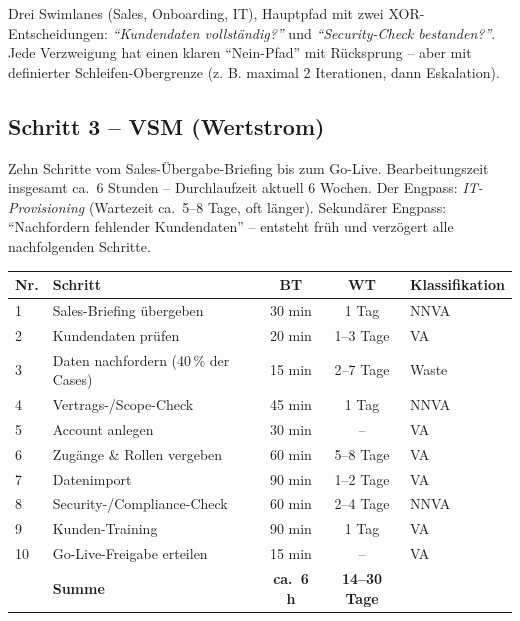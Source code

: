 \documentclass[11pt,a4paper,oneside]{article}
\begin{document}
Drei Swimlanes (Sales, Onboarding, IT), Hauptpfad mit zwei XOR-Entscheidungen: \emph{``Kundendaten vollständig?''} und \emph{``Security-Check bestanden?''}. Jede Verzweigung hat einen klaren ``Nein-Pfad'' mit Rücksprung -- aber mit definierter Schleifen-Obergrenze (z. B. maximal 2 Iterationen, dann Eskalation).

\subsection{Schritt 3 -- VSM (Wertstrom)}

Zehn Schritte vom Sales-Übergabe-Briefing bis zum Go-Live. Bearbeitungszeit insgesamt ca.\ 6 Stunden -- Durchlaufzeit aktuell 6 Wochen. Der Engpass: \emph{IT-Provisioning} (Wartezeit ca.\ 5--8 Tage, oft länger). Sekundärer Engpass: ``Nachfordern fehlender Kundendaten'' -- entsteht früh und verzögert alle nachfolgenden Schritte.

\begin{tabularx}{\linewidth}{@{}lXccl@{}}
\toprule
\textbf{Nr.} & \textbf{Schritt} & \textbf{BT} & \textbf{WT} & \textbf{Klassifikation} \\
\midrule
1  & Sales-Briefing übergeben                & 30 min & 1 Tag  & NNVA \\
2  & Kundendaten prüfen                       & 20 min & 1--3 Tage & VA \\
3  & Daten nachfordern (40\,\% der Cases)     & 15 min & 2--7 Tage & Waste \\
4  & Vertrags-/Scope-Check                    & 45 min & 1 Tag  & NNVA \\
5  & Account anlegen                          & 30 min & --     & VA \\
6  & Zugänge \& Rollen vergeben               & 60 min & 5--8 Tage & VA \\
7  & Datenimport                              & 90 min & 1--2 Tage & VA \\
8  & Security-/Compliance-Check               & 60 min & 2--4 Tage & NNVA \\
9  & Kunden-Training                          & 90 min & 1 Tag  & VA \\
10 & Go-Live-Freigabe erteilen                & 15 min & --     & VA \\
\midrule
   & \textbf{Summe}                           & \textbf{ca.\ 6 h} & \textbf{14--30 Tage} & \\
\bottomrule
\end{tabularx}

\medskip
\end{document}
